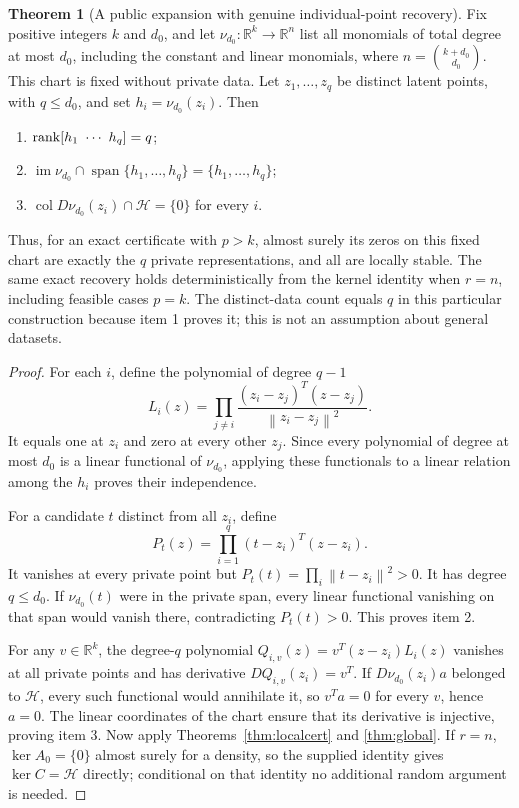 \documentclass[11pt,a4paper]{article}
\theoremstyle{definition}
\newtheorem{theorem}{Theorem}[section]
\theoremstyle{definition}
\theoremstyle{remark}\newtheorem{remark}[theorem]{Remark}
\newcommand{\R}{\mathbb R}\newcommand{\Prob}{\mathbb P}\newcommand{\E}{\mathbb E}
\newcommand{\HH}{\mathcal H}\newcommand{\XX}{\mathcal X}\newcommand{\col}{\operatorname{col}}
\newcommand{\im}{\operatorname{im}}\newcommand{\dist}{\operatorname{dist}}
\newcommand{\norm}[1]{\left\lVert #1\right\rVert}
\begin{document}
\begin{theorem}[A public expansion with genuine individual-point recovery]\label{thm:polynomial}
Fix positive integers $k$ and $d_0$, and let $\nu_{d_0}:\R^k\to\R^n$ list all monomials of total degree at most $d_0$, including the constant and linear monomials, where $n=\binom{k+d_0}{d_0}$. This chart is fixed without private data. Let $z_1,\ldots,z_q$ be distinct latent points, with $q\le d_0$, and set $h_i=\nu_{d_0}(z_i)$. Then
\begin{enumerate}
\item $\rank[h_1\ \cdots\ h_q]=q$;
\item $\im\nu_{d_0}\cap\operatorname{span}\{h_1,\ldots,h_q\}=\{h_1,\ldots,h_q\}$;
\item $\col D\nu_{d_0}(z_i)\cap\HH=\{0\}$ for every $i$.
\end{enumerate}
Thus, for an exact certificate with $p>k$, almost surely its zeros on this fixed chart are exactly the $q$ private representations, and all are locally stable. The same exact recovery holds deterministically from the kernel identity when $r=n$, including feasible cases $p=k$. The distinct-data count equals $q$ in this particular construction because item 1 proves it; this is not an assumption about general datasets.
\end{theorem}
\begin{proof}
For each $i$, define the polynomial of degree $q-1$
\[
L_i(z)=\prod_{j\ne i}\frac{(z_i-z_j)^T(z-z_j)}{\norm{z_i-z_j}^2}.
\]
It equals one at $z_i$ and zero at every other $z_j$. Since every polynomial of degree at most $d_0$ is a linear functional of $\nu_{d_0}$, applying these functionals to a linear relation among the $h_i$ proves their independence.

For a candidate $t$ distinct from all $z_i$, define
\[
P_t(z)=\prod_{i=1}^q (t-z_i)^T(z-z_i).
\]
It vanishes at every private point but $P_t(t)=\prod_i\norm{t-z_i}^2>0$. It has degree $q\le d_0$. If $\nu_{d_0}(t)$ were in the private span, every linear functional vanishing on that span would vanish there, contradicting $P_t(t)>0$. This proves item 2.

For any $v\in\R^k$, the degree-$q$ polynomial $Q_{i,v}(z)=v^T(z-z_i)L_i(z)$ vanishes at all private points and has derivative $DQ_{i,v}(z_i)=v^T$. If $D\nu_{d_0}(z_i)a$ belonged to $\HH$, every such functional would annihilate it, so $v^Ta=0$ for every $v$, hence $a=0$. The linear coordinates of the chart ensure that its derivative is injective, proving item 3. Now apply Theorems~\ref{thm:localcert} and \ref{thm:global}. If $r=n$, $\ker A_0=\{0\}$ almost surely for a density, so the supplied identity gives $\ker C=\HH$ directly; conditional on that identity no additional random argument is needed.
\end{proof}
\end{document}

